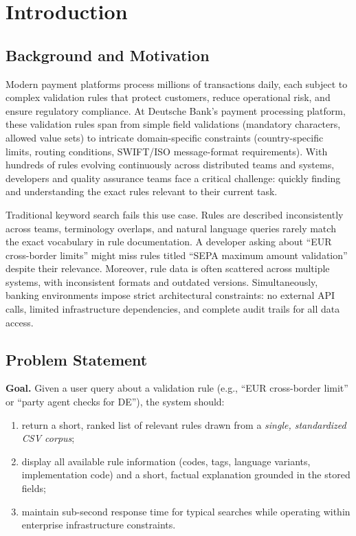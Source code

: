 \chapter{Introduction}\label{ch:introduction}

\section{Background and Motivation}
Modern payment platforms process millions of transactions daily, each subject to complex validation rules that protect customers, reduce operational risk, and ensure regulatory compliance. At Deutsche Bank's payment processing platform, these validation rules span from simple field validations (mandatory characters, allowed value sets) to intricate domain-specific constraints (country-specific limits, routing conditions, SWIFT/ISO message-format requirements). With hundreds of rules evolving continuously across distributed teams and systems, developers and quality assurance teams face a critical challenge: quickly finding and understanding the exact rules relevant to their current task.

Traditional keyword search fails this use case. Rules are described inconsistently across teams, terminology overlaps, and natural language queries rarely match the exact vocabulary in rule documentation. A developer asking about ``EUR cross-border limits'' might miss rules titled ``SEPA maximum amount validation'' despite their relevance. Moreover, rule data is often scattered across multiple systems, with inconsistent formats and outdated versions. Simultaneously, banking environments impose strict architectural constraints: no external API calls, limited infrastructure dependencies, and complete audit trails for all data access.

\section{Problem Statement}
\textbf{Goal.} Given a user query about a validation rule (e.g., ``EUR cross-border limit'' or ``party agent checks for DE''), the system should:
\begin{enumerate}[leftmargin=*,itemsep=2pt,topsep=2pt]
 \item return a short, ranked list of relevant rules drawn from a \emph{single, standardized CSV corpus};
 \item display all available rule information (codes, tags, language variants, implementation code) and a short, factual explanation grounded in the stored fields;
 \item maintain sub-second response time for typical searches while operating within enterprise infrastructure constraints.
\end{enumerate}

